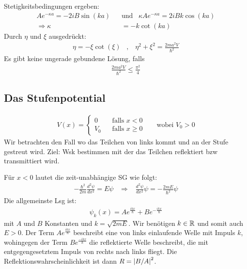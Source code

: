 Stetigkeitsbedingungen ergeben:
\begin{align*}
    A e^{- \kappa a} = -2 i B \sin(k a)
    \hspace{10pt} &\text{und} \hspace{10pt}
    \kappa A e^{- \kappa a} = 2 i B k \cos(k a)
    \\
    \Rightarrow \kappa &= -k \cot(k a)
\end{align*}
Durch $\eta$ und $\xi$ ausgedrückt:
\begin{align*}
    \eta = - \xi \cot(\xi)
    \hspace{10pt} , \hspace{10pt}
    \eta^2 + \xi^2 = \frac{2 m a^2 V}{\hbar^2}
\end{align*}
Es gibt keine ungerade gebundene Lösung, falls
\begin{align*}
    \frac{2ma^2V}{\hbar^2} \leq \frac{\pi^2}{4}
\end{align*}

\subsection{Das Stufenpotential}

\begin{align*}
    V(x) = \begin{cases}
        0 \hspace{10pt} &\text{falls } x < 0
        \\
        V_0\hspace{10pt} &\text{falls } x \geq 0
    \end{cases}
    \hspace{20pt} \text{wobei } V_0 > 0
\end{align*}
Wir betrachten den Fall wo das Teilchen von links kommt und an der Stufe
gestreut wird. Ziel: Wsk bestimmen mit der das Teilchen reflektiert bzw
transmittiert wird.

Für $x < 0$ lautet die zeit-unabhängige SG wie folgt:
\begin{align*}
    - \frac{\hbar^2}{2m} \frac{d^2 \psi}{d x^2} = E \psi
    \hspace{10pt} \Rightarrow \hspace{10pt}
    \frac{d^2 \psi}{d x^2} \psi = - \frac{2mE}{\hbar^2} \psi
\end{align*}
Die allgemeinste Lsg ist:
\begin{align*}
    \psi_k (x) = A e^{\frac{i k x}{\hbar}} + B e^{- \frac{i k x}{\hbar}}
\end{align*}
mit $A$ und $B$ Konstanten und $k=\sqrt{2mE}$. Wir benötigen $k \in \mathbb{R}$
und somit auch $E>0$. Der Term $A e^{\frac{i k x}{\hbar}}$ beschreibt eine
von links einlaufende Welle mit Impuls $k$, wohingegen der Term $B e^{\frac{-i k x}{\hbar}}$
die reflektierte Welle beschreibt, die mit entgegengesetztem Impuls von
rechts nach links fliegt. Die Reflektionswahrscheinlichkeit ist dann
$R = \left\vert B/A \right\vert^2$.

